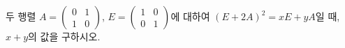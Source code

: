 \hspace*{2mm}\begin{minipage}[t]{\dimexpr\linewidth-2mm\relax}\vspace{0pt}
두 행렬 $A=\begin{pmatrix} 0 & 1 \\ 1 & 0 \end{pmatrix}$, $E=\begin{pmatrix} 1 & 0 \\ 0 & 1 \end{pmatrix}$에 대하여 $(E+2A)^2=xE+yA$일 때, $x+y$의 값을 구하시오. \end{minipage}
